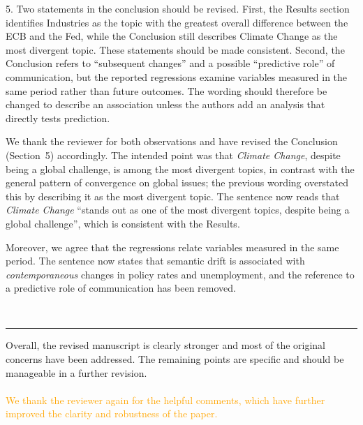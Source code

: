 \documentclass{report}
\newcommand{\revrepl}[1]{\textcolor{orange}{#1}}
\theoremstyle{plain}
\begin{document}
5. Two statements in the conclusion should be revised. First, the Results section identifies Industries as the topic with the greatest overall difference between the ECB and the Fed, while the Conclusion still describes Climate Change as the most divergent topic. These statements should be made consistent. Second, the Conclusion refers to ``subsequent changes'' and a possible ``predictive role'' of communication, but the reported regressions examine variables measured in the same period rather than future outcomes. The wording should therefore be changed to describe an association unless the authors add an analysis that directly tests prediction.
\\
{\color{orange}
We thank the reviewer for both observations and have revised the Conclusion (Section~5) accordingly. The intended point was that \textit{Climate Change}, despite being a global challenge, is among the most divergent topics, in contrast with the general pattern of convergence on global issues; the previous wording overstated this by describing it as the most divergent topic. The sentence now reads that \textit{Climate Change} ``stands out as one of the most divergent topics, despite being a global challenge'', which is consistent with the Results.

Moreover, we agree that the regressions relate variables measured in the same period. The sentence now states that semantic drift is associated with \emph{contemporaneous} changes in policy rates and unemployment, and the reference to a predictive role of communication has been removed.
}
\\
\noindent\rule{15cm}{0.4pt}
Overall, the revised manuscript is clearly stronger and most of the original concerns have been addressed. The remaining points are specific and should be manageable in a further revision.
\\
\\ \revrepl{We thank the reviewer again for the helpful comments, which have further improved the clarity and robustness of the paper.}\\

\clearpage
\end{document}
